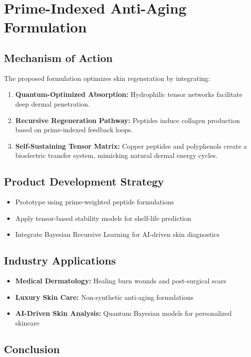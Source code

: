 \documentclass{article}
\theoremstyle{plain}
\theoremstyle{claimstyle}
\begin{document}
\section{Prime-Indexed Anti-Aging Formulation}

\subsection{Mechanism of Action}
The proposed formulation optimizes skin regeneration by integrating:
\begin{enumerate}
    \item \textbf{Quantum-Optimized Absorption:} Hydrophilic tensor networks facilitate deep dermal penetration.
    \item \textbf{Recursive Regeneration Pathway:} Peptides induce collagen production based on prime-indexed feedback loops.
    \item \textbf{Self-Sustaining Tensor Matrix:} Copper peptides and polyphenols create a bioelectric transfer system, mimicking natural dermal energy cycles.
\end{enumerate}

\subsection{Product Development Strategy}
\begin{itemize}
    \item Prototype using prime-weighted peptide formulations
    \item Apply tensor-based stability models for shelf-life prediction
    \item Integrate Bayesian Recursive Learning for AI-driven skin diagnostics
\end{itemize}

\subsection{Industry Applications}
\begin{itemize}
    \item \textbf{Medical Dermatology:} Healing burn wounds and post-surgical scars
    \item \textbf{Luxury Skin Care:} Non-synthetic anti-aging formulations
    \item \textbf{AI-Driven Skin Analysis:} Quantum Bayesian models for personalized skincare
\end{itemize}

\subsection{Conclusion}
\end{document}

